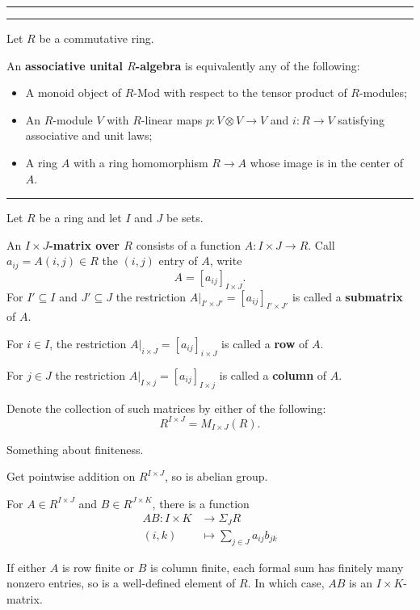 \documentclass[12pt]{article}
\newcommand{\keyword}[1]{\textbf{#1}}
\newcommand{\sepline}{\rule{\textwidth}{0.4pt}}
\theoremstyle{definition}
\newcommand{\<}{\left\langle}
\renewcommand{\>}{\right\rangle}
\newcommand{\seq}{\subseteq}
\newcommand{\tensor}{\otimes}
\newcommand{\To}{\longrightarrow}
\newcommand{\Mapsto}{\longmapsto}
\renewcommand{\_}[1]{{_{#1}}}
\begin{document}
\sepline





\sepline

Let $R$ be a commutative ring.

An \keyword{associative unital $R$-algebra} is equivalently any of the following:
\begin{itemize}
    \item A monoid object of $R$-Mod with respect to the tensor product of $R$-modules;
    \item An $R$-module $V$ with $R$-linear maps $p : V \tensor V \to V$ and $i : R \to V$ satisfying associative and unit laws;
    \item A ring $A$ with a ring homomorphism $R \to A$ whose image is in the center of $A$.
\end{itemize}

\sepline

Let $R$ be a ring and let $I$ and $J$ be sets.

An \keyword{$I \times J$-matrix over $R$} consists of a function $A : I \times J \to R$.
Call $a_{ij} = A(i, j) \in R$ the $(i, j)$ entry of $A$, write
\[
    A = [a_{ij}]_{I \times J}.
\]
For $I' \seq I$ and $J' \seq J$ the restriction $A|_{I' \times J'} = [a_{ij}]_{I' \times J'}$ is called a \keyword{submatrix} of $A$.

For $i \in I$, the restriction $A|_{i \times J} = [a_{ij}]_{i \times J}$ is called a \keyword{row} of $A$.

For $j \in J$ the restriction $A|_{I \times j} = [a_{ij}]_{I \times j}$ is called a \keyword{column} of $A$.

Denote the collection of such matrices by either of the following:
\[
    R^{I \times J} = M_{I \times J}(R).
\]

Something about finiteness.

Get pointwise addition on $R^{I \times J}$, so is abelian group.

For $A \in R^{I \times J}$ and $B \in R^{J \times K}$, there is a function
\begin{align*}
    AB : I \times K &\To \Sigma_J R \\
        (i, k) &\Mapsto \sum_{j \in J} a_{ij}b_{jk}
\end{align*}

If either $A$ is row finite or $B$ is column finite, each formal sum has finitely many nonzero entries, so is a well-defined element of $R$.
In which case, $AB$ is an $I \times K$-matrix.
\end{document}
